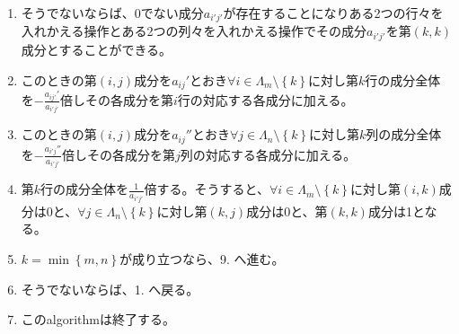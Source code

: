 \documentclass[dvipdfmx]{jsarticle}
\begin{document}
\begin{thm}
\begin{enumerate}
\item
  そうでないならば、0でない成分$a_{i'j'}$が存在することになりある2つの行々を入れかえる操作とある2つの列々を入れかえる操作でその成分$a_{i'j'}$を第$(k,k)$成分とすることができる。
\item
  このときの第$(i,j)$成分を$a_{ij}'$とおき$\forall i \in \varLambda_{m} \setminus \left\{ k \right\} に対し第k$行の成分全体を$- \frac{a_{ij'}'}{a_{i'j'}}$倍しその各成分を第$i$行の対応する各成分に加える。
\item
  このときの第$(i,j)$成分を$a_{ij}''$とおき$\forall j \in \varLambda_{n} \setminus \left\{ k \right\} に対し第k$列の成分全体を$- \frac{a_{i'j}''}{a_{i'j'}}$倍しその各成分を第$j$列の対応する各成分に加える。
\item
  第$k$行の成分全体を$\frac{1}{a_{i'j'}}$倍する。そうすると、$\forall i \in \varLambda_{m} \setminus \left\{ k \right\} に対し第(i,k)$成分は0と、$\forall j \in \varLambda_{n} \setminus \left\{ k \right\}$に対し第$(k,j)$成分は0と、第$(k,k)$成分は1となる。
\item
  $k = \min\left\{ m,n \right\}$が成り立つなら、9. へ進む。
\item
  そうでないならば、1. へ戻る。
\item
  このalgorithmは終了する。
\end{enumerate}
\end{thm}
\end{document}
